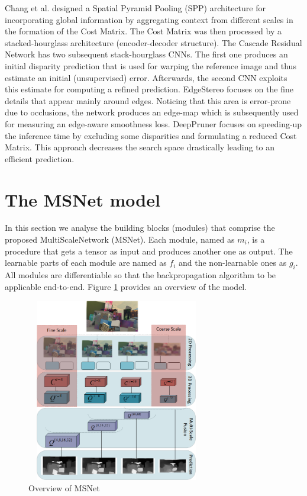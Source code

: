 \documentclass[runningheads]{llncs}
\begin{document}
Chang et al. \cite{Chang2018PyramidNetwork} designed a Spatial Pyramid Pooling (SPP) architecture for incorporating global information by aggregating context from different scales in the formation of the Cost Matrix. The Cost Matrix was then processed by a stacked-hourglass architecture (encoder-decoder structure). The Cascade Residual Network \cite{Pang2018CascadeMatching} has two subsequent stack-hourglass CNNs. The first one produces an initial disparity prediction that is used for warping the reference image and thus estimate an initial (unsupervised) error. Afterwards, the second CNN exploits this estimate for computing a refined prediction. EdgeStereo \cite{SongEdgeStereoResidual} focuses on the fine details that appear mainly around edges. Noticing that this area is error-prone due to occlusions, the network produces an edge-map which is subsequently used for measuring an edge-aware smoothness loss. DeepPruner \cite{du2019amnet} focuses on speeding-up the inference time by excluding some disparities and formulating a reduced Cost Matrix. This approach decreases the search space drastically leading to an efficient prediction.


\section{The MSNet model}

In this section we analyse the building blocks (modules) that comprise the proposed MultiScaleNetwork (MSNet). Each module, named as $m_i$, is a procedure that gets a tensor as input and produces another one as output. The learnable parts of each module are named as $f_i$ and the non-learnable ones as $g_i$. All modules are differentiable so that the backpropagation algorithm to be applicable end-to-end. Figure \ref{fig:cnn_architecture} provides an overview of the model.

\begin{figure}[!htbp]
    \centering
    \includegraphics[width=0.7\textwidth, height=8cm]{figures/stereo_architecture.png}
    \caption{Overview of MSNet}
    \label{fig:cnn_architecture}
\end{figure}
\end{document}
